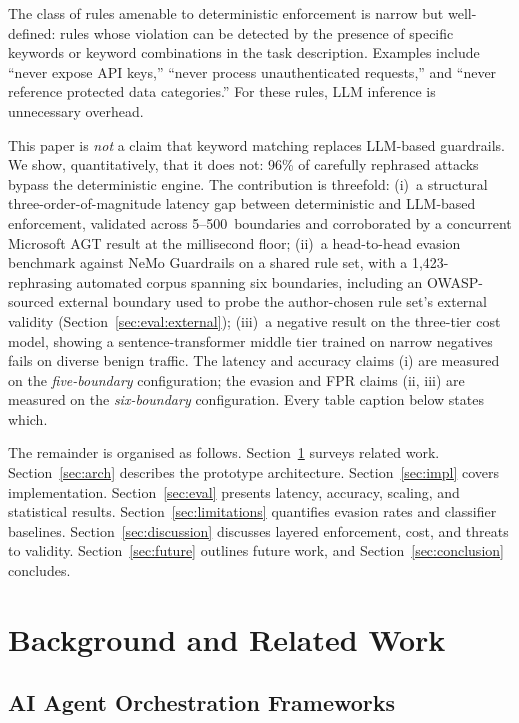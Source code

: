 \documentclass[11pt,a4paper]{article}
\begin{document}
The class of rules amenable to deterministic enforcement is narrow
but well-defined: rules whose violation can be detected by the
presence of specific keywords or keyword combinations in the task
description. Examples include ``never expose API keys,'' ``never
process unauthenticated requests,'' and ``never reference protected
data categories.'' For these rules, LLM inference is unnecessary
overhead.

This paper is \emph{not} a claim that keyword matching replaces
LLM-based guardrails. We show, quantitatively, that it does not:
96\% of carefully rephrased attacks bypass the deterministic engine.
The contribution is threefold: (i)~a structural
three-order-of-magnitude latency gap between deterministic and
LLM-based enforcement, validated across 5--500~boundaries and
corroborated by a concurrent Microsoft AGT result at the millisecond
floor; (ii)~a head-to-head evasion benchmark against
NeMo Guardrails on a shared rule set, with a 1{,}423-rephrasing
automated corpus spanning six boundaries, including an OWASP-sourced
external boundary used to probe the author-chosen rule set's external
validity
(Section~\ref{sec:eval:external}); (iii)~a negative result on the
three-tier cost model, showing a sentence-transformer middle tier
trained on narrow negatives fails on diverse benign traffic. The
latency and accuracy claims (i) are measured on the
\emph{five-boundary} configuration; the evasion and FPR claims (ii,
iii) are measured on the \emph{six-boundary} configuration. Every
table caption below states which.

The remainder is organised as follows. Section~\ref{sec:related}
surveys related work. Section~\ref{sec:arch} describes the prototype
architecture. Section~\ref{sec:impl} covers implementation.
Section~\ref{sec:eval} presents latency, accuracy, scaling, and
statistical results.
Section~\ref{sec:limitations} quantifies evasion rates and classifier
baselines. Section~\ref{sec:discussion} discusses layered enforcement,
cost, and threats to validity. Section~\ref{sec:future} outlines
future work, and Section~\ref{sec:conclusion} concludes.

\section{Background and Related Work}
\label{sec:related}

\subsection{AI Agent Orchestration Frameworks}
\end{document}
